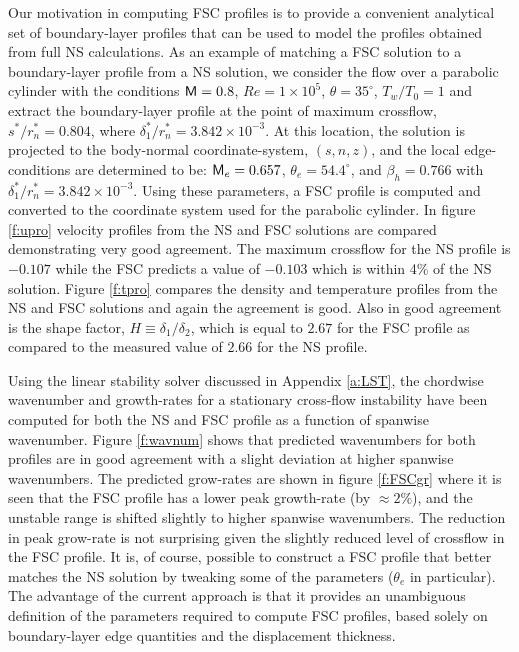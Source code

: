 Our motivation in computing FSC profiles is to provide a convenient analytical
set of boundary-layer profiles that can be used to model the profiles obtained
from full NS calculations.  As an example of matching a FSC solution to a
boundary-layer profile from a NS solution, we consider the flow over a
parabolic cylinder with the conditions ${\sf M} = 0.8$, $Re=1 \times 10^5$, $\theta
= 35^\circ$, $T_w/T_0 = 1$ and extract the boundary-layer profile at the point
of maximum crossflow, $s^*/r^*_n=0.804$, where $\delta^*_1/r^*_n = 3.842
\times 10^{-3}$.  At this location, the solution is projected to the
body-normal coordinate-system, $(s,n,z)$, and the local edge-conditions are
determined to be: ${\sf M}_e = 0.657$, $\theta_e = 54.4^\circ$, and $\beta_h =
0.766$ with $\delta^*_1/r^*_n = 3.842 \times 10^{-3}$.  Using these
parameters, a FSC profile is computed and converted to the coordinate system
used for the parabolic cylinder.  In figure \ref{f:upro} velocity profiles
from the NS and FSC solutions are compared demonstrating very good agreement.
The maximum crossflow for the NS profile is $-0.107$ while the FSC predicts a
value of $-0.103$ which is within 4\% of the NS solution.  Figure \ref{f:tpro}
compares the density and temperature profiles from the NS and FSC solutions
and again the agreement is good.  Also in good agreement is the shape factor,
$H \equiv \delta_1/\delta_2$, which is equal to $2.67$ for the FSC profile as
compared to the measured value of $2.66$ for the NS profile.

Using the linear stability solver discussed in Appendix \ref{a:LST}, the
chordwise wavenumber and growth-rates for a stationary cross-flow instability
have been computed for both the NS and FSC profile as a function of spanwise
wavenumber.  Figure \ref{f:wavnum} shows that predicted wavenumbers for both
profiles are in good agreement with a slight deviation at higher spanwise
wavenumbers.  The predicted grow-rates are shown in figure \ref{f:FSCgr} where
it is seen that the FSC profile has a lower peak growth-rate (by $\approx
2\%$), and the unstable range is shifted slightly to higher spanwise
wavenumbers.  The reduction in peak grow-rate is not surprising given the
slightly reduced level of crossflow in the FSC profile.  It is, of course,
possible to construct a FSC profile that better matches the NS solution by
tweaking some of the parameters ($\theta_e$ in particular).  The advantage of
the current approach is that it provides an unambiguous definition of the
parameters required to compute FSC profiles, based solely on boundary-layer
edge quantities and the displacement thickness.

